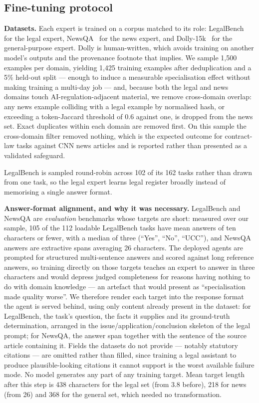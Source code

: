 \documentclass[journal,10pt,compsoc,onecolumn]{IEEEtran}
\begin{document}
\subsection{Fine-tuning protocol}
\label{sec:finetuning}

\textbf{Datasets.} Each expert is trained on a corpus matched to its role:
LegalBench~\cite{guha2023legalbench} for the legal expert,
NewsQA~\cite{trischler2017newsqa} for the news expert, and
Dolly-15k~\cite{conover2023dolly} for the general-purpose expert. Dolly is
human-written, which avoids training on another model's outputs and the
provenance footnote that implies. We sample 1{,}500 examples per domain, yielding
1{,}425 training examples after deduplication and a 5\% held-out split --- enough
to induce a measurable specialisation effect without making training a multi-day
job --- and, because both the legal and news domains touch
AI-regulation-adjacent material, we remove cross-domain overlap: any news example
colliding with a legal example by normalised hash, or exceeding a token-Jaccard
threshold of $0.6$ against one, is dropped from the news set. Exact duplicates
within each domain are removed first. On this sample the cross-domain filter
removed nothing, which is the expected outcome for contract-law tasks against CNN
news articles and is reported rather than presented as a validated safeguard.

LegalBench is sampled round-robin across 102 of its 162 tasks rather than drawn
from one task, so the legal expert learns legal register broadly instead of
memorising a single answer format.

\textbf{Answer-format alignment, and why it was necessary.} LegalBench and NewsQA
are \emph{evaluation} benchmarks whose targets are short: measured over our
sample, 105 of the 112 loadable LegalBench tasks have mean answers of ten
characters or fewer, with a median of three (``Yes'', ``No'', ``UCC''), and NewsQA
answers are extractive spans averaging 26 characters. The deployed agents are
prompted for structured multi-sentence answers and scored against long reference
answers, so training directly on those targets teaches an expert to answer in
three characters and would depress judged completeness for reasons having nothing
to do with domain knowledge --- an artefact that would present as
``specialisation made quality worse''. We therefore render each target into the
response format the agent is served behind, using only content already present in
the dataset: for LegalBench, the task's question, the facts it supplies and its
ground-truth determination, arranged in the issue/application/conclusion skeleton
of the legal prompt; for NewsQA, the answer span together with the sentence of
the source article containing it. Fields the datasets do not provide --- notably
statutory citations --- are omitted rather than filled, since training a legal
assistant to produce plausible-looking citations it cannot support is the worst
available failure mode. No model generates any part of any training target. Mean
target length after this step is 438 characters for the legal set (from 3.8
before), 218 for news (from 26) and 368 for the general set, which needed no
transformation.
\end{document}
